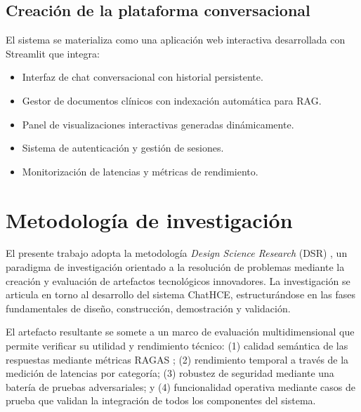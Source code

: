 \subsection{Creación de la plataforma conversacional}

El sistema se materializa como una aplicación web interactiva desarrollada con Streamlit que integra:

\begin{itemize}[nosep, leftmargin=*]
    \item Interfaz de chat conversacional con historial persistente.
    \item Gestor de documentos clínicos con indexación automática para \ac{RAG}.
    \item Panel de visualizaciones interactivas generadas dinámicamente.
    \item Sistema de autenticación y gestión de sesiones.
    \item Monitorización de latencias y métricas de rendimiento.
\end{itemize}

\section{Metodología de investigación}
\label{sec:metodologia}

El presente trabajo adopta la metodología \textit{Design Science Research} (\acs{DSR}) \parencite{Hevner2004,Peffers2007dsrm}, un paradigma de investigación orientado a la resolución de problemas mediante la creación y evaluación de artefactos tecnológicos innovadores. La investigación se articula en torno al desarrollo del sistema ChatHCE, estructurándose en las fases fundamentales de diseño, construcción, demostración y validación.

El artefacto resultante se somete a un marco de evaluación multidimensional que permite verificar su utilidad y rendimiento técnico: (1) calidad semántica de las respuestas mediante métricas \ac{RAGAS} \parencite{Es2023ragas}; (2) rendimiento temporal a través de la medición de latencias por categoría; (3) robustez de seguridad mediante una batería de pruebas adversariales; y (4) funcionalidad operativa mediante casos de prueba que validan la integración de todos los componentes del sistema.

